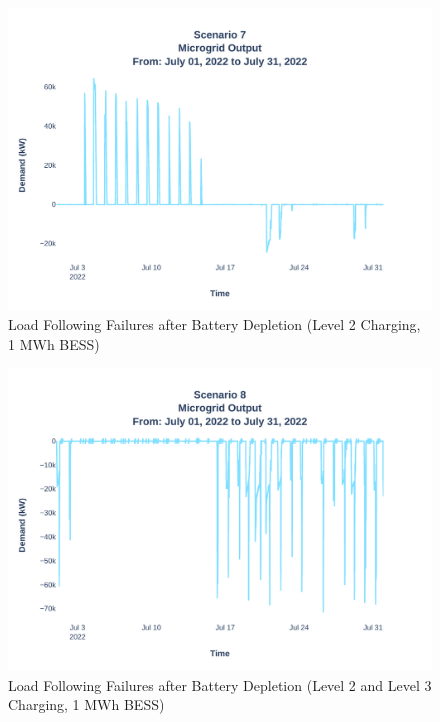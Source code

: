 \documentclass[conference,  usletter]{IEEEtran}
\begin{document}
\begin{figure}
\centering
\includegraphics[width=\linewidth]{Fig/Option_3/4_Scenario_7_Run_3_Mg_Output_Jul_01_2022_to_Jul_31_2022.pdf}
\caption{\footnotesize Load Following Failures after Battery Depletion (Level 2 Charging, 1 MWh BESS)}
\label{fig:scenario3peakshaving}
\end{figure}
\begin{figure}
\centering
\includegraphics[width=\linewidth]{Fig/Option_3/4_Scenario_8_Run_3_Mg_Output_Jul_01_2022_to_Jul_31_2022.pdf}
\caption{\footnotesize Load Following Failures after Battery Depletion (Level 2 and Level 3 Charging, 1 MWh BESS)}
\label{fig:scenario4peakshaving}
\end{figure}
\end{document}

